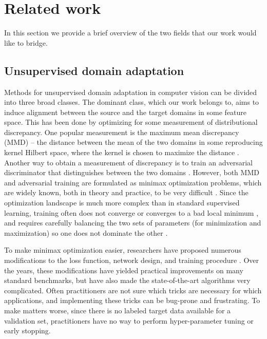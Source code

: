 \documentclass{article} \usepackage{iclr2020_conference,times}
\begin{document}

\section{Related work}
\label{related}

In this section we provide a brief overview of the two fields that our work would like to bridge. 

\subsection{Unsupervised domain adaptation}

Methods for unsupervised domain adaptation in computer vision can be divided into three broad classes.
The dominant class, which our work belongs to, aims to induce alignment between the source and the target domains in some feature space.
This has been done by 
optimizing for some measurement of distributional discrepancy.
One popular measurement is the maximum mean discrepancy (MMD)
-- the distance between the mean of the two domains in some reproducing kernel Hilbert space, where the kernel is chosen to maximize the distance
\citep{bousmalis2016domain, long2015learning, long2017deep}.
Another way to obtain a measurement of discrepancy is to train an adversarial discriminator that distinguishes between the two domains \citep{ganin2014unsupervised, ganin2016domain, tzeng2017adversarial}. 
However, both MMD and adversarial training are formulated as minimax optimization problems, which are widely known, both in theory and practice, to be very difficult
\citep{fedus2017many, duchi2016local, liang2017well, jin2019minmax}.
Since the optimization landscape is much more complex than in standard supervised learning, training often does not converge or converges to a bad local minimum \citep{goodfellow2016nips, nagarajan2017gradient, li2017limitations}, and requires carefully balancing the two sets of parameters (for minimization and maximization) so one does not dominate the other \citep{salimans2016improved, neyshabur2017stabilizing}.

To make minimax optimization easier, researchers have proposed numerous modifications to the loss function, network design, and training procedure
\citep{arjovsky2017wasserstein, gulrajani2017improved, karras2017progressive, courty2017optimal, sun2016deep, shu2018dirt, sener2016learning}.
Over the years, these modifications have yielded practical improvements on many standard benchmarks, but have also made the state-of-the-art algorithms very complicated.
Often practitioners are not sure which tricks are necessary for which applications, and implementing these tricks can be bug-prone and frustrating.
To make matters worse, since there is no labeled target data available for a validation set, practitioners have no way to perform hyper-parameter tuning or early stopping.
\end{document}
